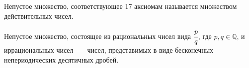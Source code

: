 \documentclass{article}
\begin{document}
Непустое множество, соответствующее 17 аксиомам называется множеством действительных чисел.


Непустое множество, состоящее из рациональных чисел вида $\cfrac{p}{q}$, где $p,q\in\mathbb{Q}$,
и иррациональных чисел~---~чисел, представимых в виде бесконечных непериодических десятичных дробей.

\newcommand{\markax}[3]{
	\draw [decorate, decoration={brace}] ($({pic cs:#1}) + (19em, 1em)$) -- ($({pic cs:#2}) + (19em,0)$)
	node [midway, right] {#3};
}
\end{document}
